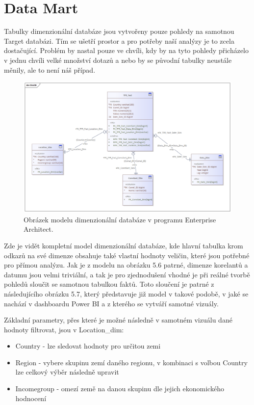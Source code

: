 \documentclass[thesis=M,czech]{FITthesis}[2022/10/08]
\begin{document}
\section{Data Mart}

Tabulky dimenzionální databáze jsou vytvořeny pouze pohledy na samotnou Target databázi. Tím se ušetří prostor a pro potřeby naší analýzy je to zcela dostačující. Problém by nastal pouze ve chvíli, kdy by na tyto pohledy přicházelo v jednu chvíli velké množství dotazů a nebo by se původní tabulky neustále měnily, ale to není náš případ. 

\begin{figure}
    \centering
    \includegraphics[width=\textwidth]{DP-obrazky/DimDB.png}
    \caption{Obrázek modelu dimenzionální databáze v programu Enterprise Architect.}
    \label{fig:DD_Model}
\end{figure}

Zde je vidět kompletní model dimenzionální databáze, kde hlavní tabulka krom odkazů na své dimenze obsahuje také vlastní hodnoty veličin, které jsou potřebné pro přímou analýzu.  
Jak je z modelu na obrázku 5.6 patrné, dimenze korelantů a datumu jsou velmi triviální, a tak je pro zjednodušení vhodné je při reálné tvorbě pohledů sloučit se samotnou tabulkou faktů. Toto sloučení je patrné z následujícího obrázku 5.7, který představuje již model v takové podobě, v jaké se nachází v dashboardu Power BI a z kterého se vytváří samotné vizuály.

Základní parametry, přes které je možné následně v samotném vizuálu dané hodnoty filtrovat, jsou v Location\_dim:

\begin{itemize}
    \item Country - lze sledovat hodnoty pro určitou zemi 
    \item Region - vybere skupinu zemí daného regionu, v kombinaci s volbou Country lze celkový výběr následně upravit
    \item Incomegroup - omezí země na danou skupinu dle jejich ekonomického hodnocení
\end{itemize}
\end{document}
